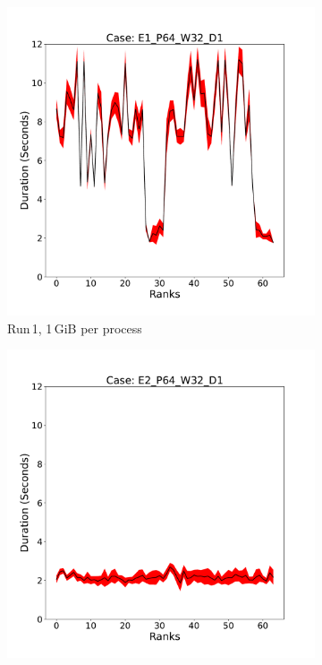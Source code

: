 \begin{figure}[h!]
     \centering
     \begin{subfigure}[b]{0.3\textwidth}
         \centering
         \includegraphics[width=\textwidth, height=\textwidth]{figures/deisa2__E1_P64_W32_D1.pdf}
         \caption{Run\,1, 1\,GiB per process}
         \label{fig:E1_1_d22}
     \end{subfigure}
     \hfill
     \begin{subfigure}[b]{0.3\textwidth}
         \centering
         \includegraphics[width=\textwidth, height=\textwidth]{figures/deisa2__E2_P64_W32_D1.pdf}

\end{subfigure}
\end{figure}
